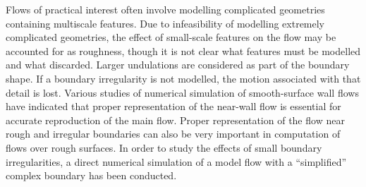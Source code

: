 Flows of practical interest often involve modelling complicated geometries containing multiscale features. Due to infeasibility of modelling extremely complicated geometries, the effect of small-scale features on the flow may be accounted for as roughness, though it is not clear what features must be modelled and what discarded\cite{nakayama2002}. Larger undulations are considered as part of the boundary shape. If a boundary irregularity is not modelled, the motion associated with that detail is lost. Various studies of numerical simulation of smooth-surface wall flows have indicated that proper representation of the near-wall flow is essential for accurate reproduction of the main flow\cite{nakayama2009}. Proper representation of the flow near rough and irregular boundaries can also be very important in computation of flows over rough surfaces. In order to study the effects of small boundary irregularities, a direct numerical simulation of a model flow with a ``simplified'' complex boundary has been conducted.
